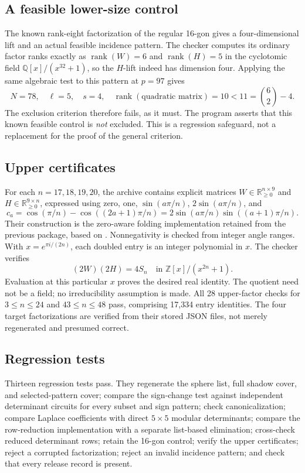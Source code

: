 \documentclass[11pt]{article}
\theoremstyle{definition}
\newcommand{\rank}{\operatorname{rank}}
\newcommand{\R}{\mathbb R}
\newcommand{\Q}{\mathbb Q}
\begin{document}
\subsection{A feasible lower-size control}
The known rank-eight factorization of the regular 16-gon gives a four-dimensional lift and an actual feasible incidence pattern. The checker computes its ordinary factor ranks exactly as $\rank(W)=6$ and $\rank(H)=5$ in the cyclotomic field $\Q[x]/(x^{32}+1)$, so the $H$-lift indeed has dimension four. Applying the same algebraic test to this pattern at $p=97$ gives
\[
 N=78,\quad\ell=5,\quad s=4,\quad
 \rank(\text{quadratic matrix})=10<11=\binom{6}{2}-4.
\]
The exclusion criterion therefore fails, as it must. The program asserts that this known feasible control is \emph{not} excluded. This is a regression safeguard, not a replacement for the proof of the general criterion.

\subsection{Upper certificates}
For each $n=17,18,19,20$, the archive contains explicit matrices $W\in\R_{\ge0}^{n\times9}$ and $H\in\R_{\ge0}^{9\times n}$, expressed using zero, one, $\sin(a\pi/n)$, $2\sin(a\pi/n)$, and
\[
 c_a=\cos(\pi/n)-\cos((2a+1)\pi/n)
     =2\sin(a\pi/n)\sin((a+1)\pi/n).
\]
Their construction is the zero-aware folding implementation retained from the previous package, based on \cite{vgg}. Nonnegativity is checked from integer angle ranges. With $x=e^{\pi i/(2n)}$, each doubled entry is an integer polynomial in $x$. The checker verifies
\[
 (2W)(2H)=4S_n\quad\text{in }\mathbb Z[x]/(x^{2n}+1).
\]
Evaluation at this particular $x$ proves the desired real identity. The quotient need not be a field; no irreducibility assumption is made. All 28 upper-factor checks for $3\le n\le24$ and $43\le n\le48$ pass, comprising 17,334 entry identities. The four target factorizations are verified from their stored JSON files, not merely regenerated and presumed correct.

\subsection{Regression tests}
Thirteen regression tests pass. They regenerate the sphere list, full shadow cover, and selected-pattern cover; compare the sign-change test against independent determinant circuits for every subset and sign pattern; check canonicalization; compare Laplace coefficients with direct $5\times5$ modular determinants; compare the row-reduction implementation with a separate list-based elimination; cross-check reduced determinant rows; retain the 16-gon control; verify the upper certificates; reject a corrupted factorization; reject an invalid incidence pattern; and check that every release record is present.
\end{document}
